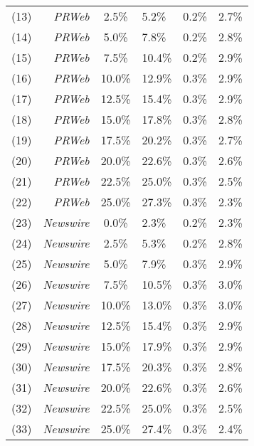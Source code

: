 \begin{supptable}[htb!]
\begin{center}
\begin{tabular}{lrcllc}
(13) & \emph{PRWeb} & 2.5\% & 5.2\% & 0.2\% & 2.7\% \\
(14) & \emph{PRWeb} & 5.0\% & 7.8\% & 0.2\% & 2.8\% \\
(15) & \emph{PRWeb} & 7.5\% & 10.4\% & 0.2\% & 2.9\% \\
(16) & \emph{PRWeb} & 10.0\% & 12.9\% & 0.3\% & 2.9\% \\
(17) & \emph{PRWeb} & 12.5\% & 15.4\% & 0.3\% & 2.9\% \\
(18) & \emph{PRWeb} & 15.0\% & 17.8\% & 0.3\% & 2.8\% \\
(19) & \emph{PRWeb} & 17.5\% & 20.2\% & 0.3\% & 2.7\% \\
(20) & \emph{PRWeb} & 20.0\% & 22.6\% & 0.3\% & 2.6\% \\
(21) & \emph{PRWeb} & 22.5\% & 25.0\% & 0.3\% & 2.5\% \\
(22) & \emph{PRWeb} & 25.0\% & 27.3\% & 0.3\% & 2.3\% \\
\cmidrule{1-6}
(23) & \emph{Newswire} & 0.0\% & 2.3\% & 0.2\% & 2.3\% \\
(24) & \emph{Newswire} & 2.5\% & 5.3\% & 0.2\% & 2.8\% \\
(25) & \emph{Newswire} & 5.0\% & 7.9\% & 0.3\% & 2.9\% \\
(26) & \emph{Newswire} & 7.5\% & 10.5\% & 0.3\% & 3.0\% \\
(27) & \emph{Newswire} & 10.0\% &13.0\% & 0.3\% & 3.0\% \\
(28) & \emph{Newswire} & 12.5\% & 15.4\% & 0.3\% & 2.9\% \\
(29) & \emph{Newswire} & 15.0\% & 17.9\% & 0.3\% & 2.9\% \\
(30) & \emph{Newswire} & 17.5\% & 20.3\% & 0.3\% & 2.8\% \\
(31) & \emph{Newswire} & 20.0\% & 22.6\% & 0.3\% & 2.6\% \\
(32) & \emph{Newswire} & 22.5\% & 25.0\% & 0.3\% & 2.5\% \\
(33) & \emph{Newswire} & 25.0\% & 27.4\% & 0.3\% & 2.4\% \\
\cmidrule[\heavyrulewidth]{1-6}
\end{tabular}
\end{center}
\vspace{-5mm}
\end{supptable}


